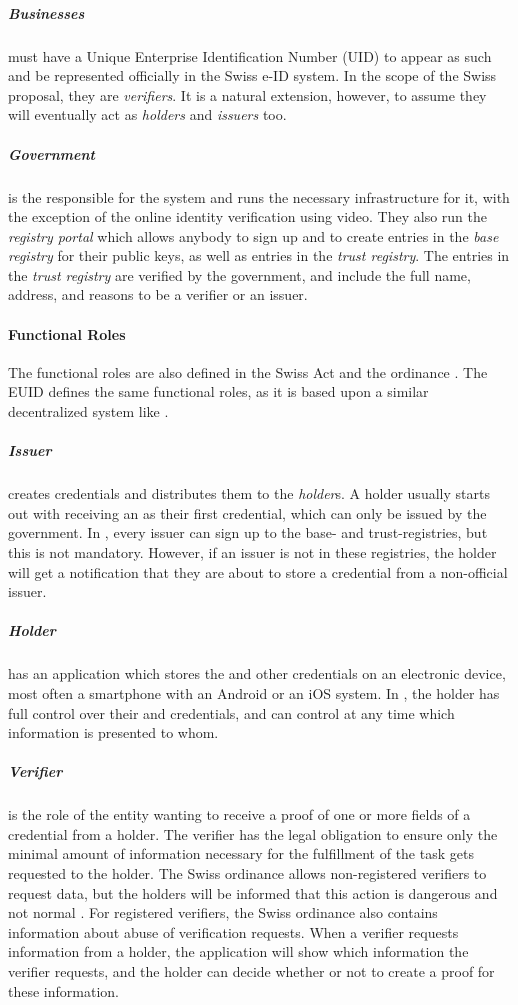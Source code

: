 \subparagraph{Businesses}
must have a Unique Enterprise Identification Number (UID) to appear as such and be represented officially in the Swiss e-ID system.
In the scope of the Swiss proposal, they are \emph{verifiers}.
It is a natural extension, however, to assume they will eventually act as \emph{holders} and \emph{issuers} too.

\subparagraph{Government}
is the responsible for the system and runs the necessary infrastructure for it, with the exception of the online identity verification using video.
They also run the \emph{registry portal} which allows anybody to sign up and to create entries in the \emph{base registry} for their public keys, as well as entries in the \emph{trust registry}.
The entries in the \emph{trust registry} are verified by the government, and include the full name, address, and reasons to be a verifier or an issuer.

\paragraph{Functional Roles}

The functional roles are also defined in the Swiss \eid Act \cite{BGEID24} and the ordinance \cite{VEID25}.
The EUID \cite{EUDI-ARF} defines the same functional roles, as it is based upon a similar decentralized system like \swiyu.


\subparagraph{Issuer} creates credentials and distributes them to the \emph{holder}s.
A holder usually starts out with receiving an \eid as their first credential, which can only be issued by the government.
In \swiyu, every issuer can sign up to the base- and trust-registries, but this is not mandatory.
However, if an issuer is not in these registries, the holder will get a notification that they are about to store a credential from a non-official issuer.

\subparagraph{Holder} has an application which stores the \eid and other credentials on an electronic device, most often a smartphone with an Android or an iOS system.
In \swiyu, the holder has full control over their \eid and credentials, and can control at any time which information is presented to whom.

\subparagraph{Verifier} is the role of the entity wanting to receive a proof of one or more fields of a credential from a holder.
The verifier has the legal obligation to ensure only the minimal amount of information necessary for the fulfillment of the task gets requested to the holder.
The Swiss ordinance allows non-registered verifiers to request data, but the holders will be informed that this action is dangerous and not normal \cite[Art. 14]{VEID25}.
For registered verifiers, the Swiss ordinance also contains information about abuse of verification requests.
When a verifier requests information from a holder, the application will show which information the verifier requests, and the holder can decide whether or not to create a proof for these information.
